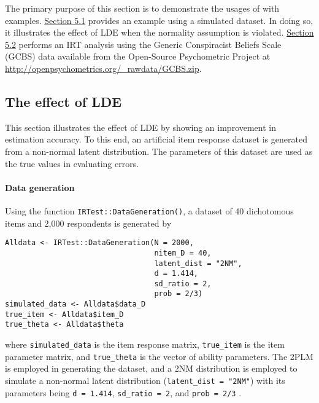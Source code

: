 The primary purpose of this section is to demonstrate the usages of
 with examples. \protect\hyperlink{the-effect-of-the-lde}{Section 5.1}
provides an example using a simulated dataset. In doing so, it
illustrates the effect of LDE when the normality assumption is violated.
\protect\hyperlink{an-empirical-example}{Section 5.2} performs an IRT analysis using
the Generic Conspiracist Beliefs Scale (GCBS) data \citep{GCBS} available from
the Open-Source Psychometric Project at
\url{http://openpsychometrics.org/_rawdata/GCBS.zip}.

\hypertarget{the-effect-of-the-lde}{%
\subsection{The effect of LDE}\label{the-effect-of-the-lde}}

This section illustrates the effect of LDE by showing an improvement
in estimation accuracy. To this end, an artificial item response dataset is
generated from a non-normal latent distribution. The parameters of this
dataset are used as the true values in evaluating errors.

\hypertarget{data-generation}{%
\paragraph{Data generation}\label{data-generation}}

Using the function \texttt{IRTest::DataGeneration()}, a dataset of 40 dichotomous items
and 2,000 respondents is generated by

\begin{verbatim}
Alldata <- IRTest::DataGeneration(N = 2000,
                                  nitem_D = 40,
                                  latent_dist = "2NM",
                                  d = 1.414,
                                  sd_ratio = 2,
                                  prob = 2/3)
simulated_data <- Alldata$data_D
true_item <- Alldata$item_D
true_theta <- Alldata$theta
\end{verbatim}

where \texttt{simulated\_data} is the item response matrix, \texttt{true\_item} is the
item parameter matrix, and \texttt{true\_theta} is the vector of ability
parameters. The 2PLM is employed in generating the dataset, and
a 2NM distribution is employed to simulate a non-normal latent
distribution (\texttt{latent\_dist\ =\ "2NM"}) with its parameters being \texttt{d\ =\ 1.414},
\texttt{sd\_ratio\ =\ 2}, and \texttt{prob\ =\ 2/3} \citep[for the reparameterization of the 2NM, see][]{Li:2021, IRTest}.

